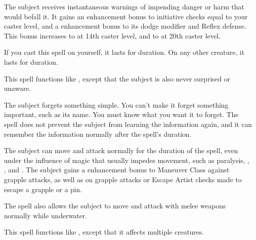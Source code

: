 \spelleffect The subject receives instantaneous warnings of impending danger or harm that would befall it. It gains an enhancement bonus to initiative checks equal to your caster level, and a  enhancement bonus to its dodge modifier and Reflex defense. This bonus increases to  at 14th caster level, and to  at 20th caster level.
\par If you cast this spell on yourself, it lasts for \durlong duration. On any other creature, it lasts for \durshort duration.

\spelleffect This spell functions like , except that the subject is also never surprised or unaware.

\spelldur{\durlong}
\spelleffect The subject forgets something simple. You can't make it forget something important, such as its name. You must know what you want it to forget. The spell does not prevent the subject from learning the information again, and it can remember the information normally after the spell's duration.

\spelldur{\durshort}
\spelleffect The subject can move and attack normally for the duration of the spell, even under the influence of magic that usually impedes movement, such as paralysis, , , and . The subject gains a  enhancement bonus to Maneuver Class against grapple attacks, as well as on grapple attacks or Escape Artist checks made to escape a grapple or a pin.
\par The spell also allows the subject to move and attack with melee weapons normally while underwater.

\spelleffect This spell functions like , except that it affects multiple creatures.

